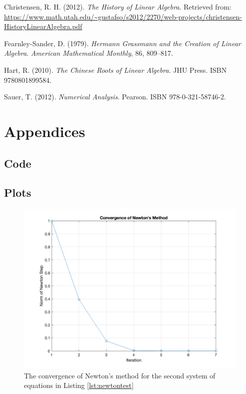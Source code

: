\documentclass[11pt]{article}
\begin{document}
\begin{thebibliography}{}
  Christensen, R. H. (2012).
  \textit{The History of Linear Algebra}.
  Retrieved from: \url{https://www.math.utah.edu/~gustafso/s2012/2270/web-projects/christensen-HistoryLinearAlgebra.pdf}
  
  Fearnley-Sander, D. (1979).
  \textit{Hermann Grassmann and the Creation of Linear Algebra}.
  \textit{American Mathematical Monthly}, 86, 809–817.
  
  Hart, R. (2010).
  \textit{The Chinese Roots of Linear Algebra}.
  JHU Press. ISBN 9780801899584.
  
  Sauer, T. (2012).
  \textit{Numerical Analysis}.
  Pearson. ISBN 978-0-321-58746-2.
\end{thebibliography}
  

\section{Appendices}

\subsection{Code}





\subsection{Plots}

\begin{figure}[h]
  \centering
  \includegraphics[width=\textwidth]{newtonplot.png}
  \caption{The convergence of Newton's method for the second system of equations in Listing \ref{lst:newtontest}}
  \label{fig:newtonplot}
\end{figure}
\end{document}
